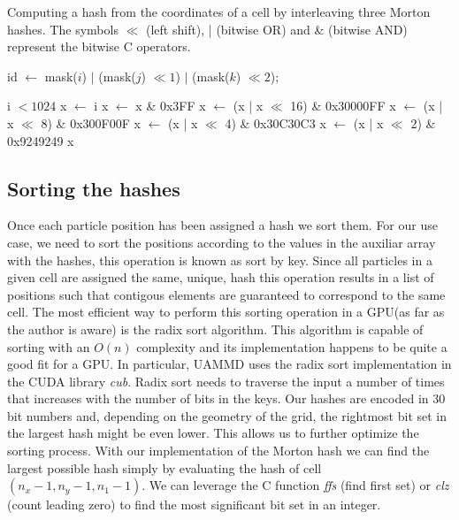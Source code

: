 \documentclass[ twoside,openright,titlepage,numbers=noenddot,%
headinclude,footinclude,cleardoublepage=empty,abstract=on,
BCOR=5mm,paper=a4,fontsize=11pt, dvipsnames
]{scrreprt}
\newcommand{\uammd}{\gls{UAMMD}\xspace}
\newcommand{\gpu}{\gls{GPU}\xspace}
\begin{document}
\begin{algorithm}
  \caption{Computing a hash from the coordinates of a cell by interleaving three Morton hashes. The symbols $\ll$ (left shift), | (bitwise OR) and \& (bitwise AND) represent the bitwise C operators. } \label{alg:mortonhash}
  \begin{algorithmic}[1]
    
    \State \Return id $\gets$ mask($i$) $|$ (mask($j$)  $\ll 1$) $|$ (mask($k$) $\ll 2$);
    \EndFunction

    \Ensure i $< 1024$
    \State x $\gets$ i     
    \State x $\gets$ x \& 0x3FF
    \State x $\gets$ (x | x $\ll$  16) \& 0x30000FF
    \State x $\gets$ (x | x $\ll$  8)  \& 0x300F00F
    \State x $\gets$ (x | x $\ll$  4)  \& 0x30C30C3
    \State x $\gets$ (x | x $\ll$  2)  \& 0x9249249
    \State \Return x
    \EndFunction

  \end{algorithmic}
\end{algorithm}



\subsection*{Sorting the hashes}
Once each particle position has been assigned a hash we sort them. For our use case, we need to sort the positions according to the values in the auxiliar array with the hashes, this operation is known as sort by key. Since all particles in a given cell are assigned the same, unique, hash this operation results in a list of positions such that contigous elements are guaranteed to correspond to the same cell.
The most efficient way to perform this sorting operation in a \gpu (as far as the author is aware) is the radix sort algorithm\cite{Ha2009}\cite{Singh2018}\cite{Merrill2011}. This algorithm is capable of sorting with an $O(n)$ complexity and its implementation happens to be quite a good fit for a \gpu. In particular, \uammd uses the radix sort implementation in the CUDA library \emph{cub}\cite{cub}. Radix sort needs to traverse the input a number of times that increases with the number of bits in the keys. Our hashes are encoded in $30$ bit numbers and, depending on the geometry of the grid, the rightmost bit set in the largest hash might be even lower. This allows us to further optimize the sorting process. With our implementation of the Morton hash we can find the largest possible hash simply by evaluating the hash of cell $(n_x-1, n_y-1, n_1-1)$. We can leverage the C function \emph{ffs} (find first set) or \emph{clz} (count leading zero) to find the most significant bit set in an integer.
\end{document}
